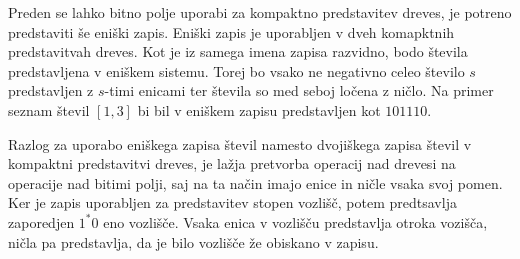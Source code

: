 Preden se lahko bitno polje uporabi za kompaktno predstavitev dreves, je potreno predstaviti še eniški zapis. Eniški zapis je uporabljen v dveh komapktnih predstavitvah dreves. Kot je iz samega imena zapisa razvidno, bodo števila predstavljena v eniškem sistemu. Torej bo vsako ne negativno celeo število $s$ predstavljen z $s$-timi enicami ter števila so med seboj ločena z ničlo. Na primer seznam števil $[1,3]$ bi bil v eniškem zapisu predstavljen kot $101110$.

Razlog za uporabo eniškega zapisa števil namesto dvojiškega zapisa števil v kompaktni predstavitvi dreves, je lažja pretvorba operacij nad drevesi na operacije nad bitimi polji, saj na ta način imajo enice in ničle vsaka svoj pomen. Ker je zapis uporabljen za predstavitev stopen vozlišč, potem predtsavlja zaporedjen $1^*0$ eno vozlišče. Vsaka enica v vozlišču predstavlja otroka vozišča, ničla pa predstavlja, da je bilo vozlišče že obiskano v zapisu.

